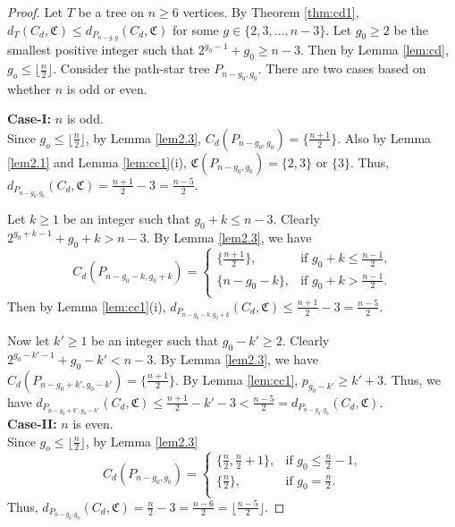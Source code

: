 \documentclass[10pt,a4paper]{amsart}
\begin{document}
\begin{proof}
Let $T$ be a tree on $n\geq 6$ vertices. By Theorem \ref{thm:cd1}, $d_T(C_d,\mathfrak{C})\leq d_{P_{n-g,g}}(C_d,\mathfrak{C})$ for some $g\in \{2,3,\ldots,n-3\}$.  
Let $g_0\geq 2$ be the smallest positive integer such that $2^{g_0-1}+g_0\geq n-3$. Then by Lemma \ref{lem:cd}, $g_o\leq \lfloor \frac{n}{2} \rfloor$. Consider the path-star tree $P_{n-g_0,g_0}$. There are two cases based on whether $n$ is odd or even.

\textbf{Case-I:} $n$ is odd.\\
Since $g_o\leq \lfloor \frac{n}{2} \rfloor$, by Lemma \ref{lem2.3},  $C_d(P_{n-g_0,g_0})=\{\frac{n+1}{2}\}$. Also by Lemma \ref{lem2.1} and Lemma \ref{lem:cc1}(i), $\mathfrak{C}(P_{n-g_0,g_0})=\{2,3\}$ or $\{3\}$. Thus, $d_{P_{n - g_0, g_0}}(C_d,\mathfrak{C})= \frac{n+1}{2} - 3=\frac{n-5}{2}.$

Let $k\geq 1$ be an integer such that $g_0+k\leq n-3$. Clearly $2^{g_0+k-1}+g_0+k> n-3$. By Lemma \ref{lem2.3}, we have 
$$C_d(P_{n-g_0-k,g_0+k})=\left\{
\begin{array}{ll}
  \{\frac{n+1}{2}\},  &\text{if $g_0+k\leq \frac{n-1}{2}$,}\\
  \{n-g_0-k\}, &\text{if $g_0+k> \frac{n-1}{2}$.}\\
\end{array}
\right.$$ 
Then by Lemma \ref{lem:cc1}(i), $d_{P_{n - g_0-k, g_0+k}}(C_d,\mathfrak{C})\leq \frac{n+1}{2} - 3=\frac{n-5}{2}.$

Now let $k'\geq 1$ be an integer such that $g_0-k'\geq 2$. Clearly $2^{g_0-k'-1}+g_0-k'< n-3$. By Lemma \ref{lem2.3}, we have $C_d(P_{n-g_0+k',g_0-k'})=\{\frac{n+1}{2}\}$. By Lemma \ref{lem:cc1}, $ p_{g_0-k'}\geq k'+3$. Thus, we have $d_{P_{n - g_0+k', g_0-k'}}(C_d,\mathfrak{C})\leq \frac{n+1}{2}-k'-3<\frac{n-5}{2}=d_{P_{n - g_0, g_0}}(C_d,\mathfrak{C})$.\\

\textbf{Case-II:} $n$ is even.\\
Since $g_o\leq \lfloor \frac{n}{2} \rfloor$, by Lemma \ref{lem2.3}
$$C_d(P_{n-g_0,g_0})=\left\{
\begin{array}{ll}
  \{\frac{n}{2},\frac{n}{2}+1 \},  &\text{if $g_0\leq \frac{n}{2}-1$,}\\
  \{\frac{n}{2}\}, &\text{if $g_0 =\frac{n}{2}$.}\\
\end{array}
\right.$$ 
Thus, $d_{P_{n - g_0, g_0}}(C_d,\mathfrak{C})= \frac{n}{2} - 3=\frac{n-6}{2}=\lfloor \frac{n-5}{2} \rfloor.$


\end{proof}
\end{document}
